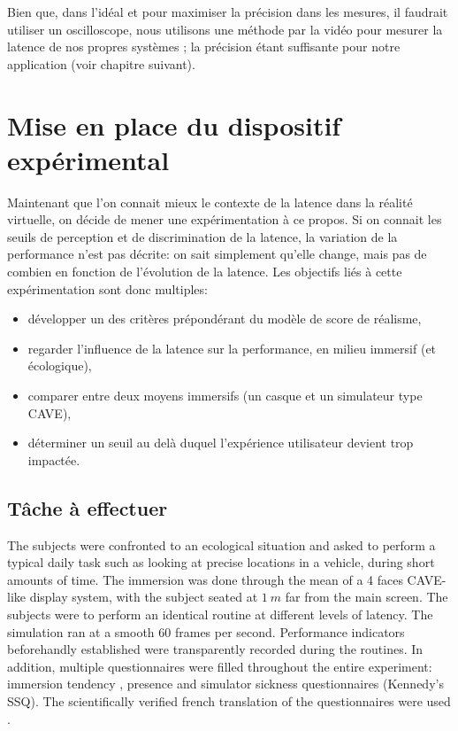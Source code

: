 	\par Bien que, dans l'idéal et pour maximiser la précision dans les mesures, il faudrait utiliser un oscilloscope, nous utilisons une méthode par la vidéo pour mesurer la latence de nos propres systèmes ; la précision étant suffisante pour notre application (voir chapitre suivant).
	
	
\chapter{Mise en place du dispositif expérimental}
	\par Maintenant que l'on connait mieux le contexte de la latence dans la réalité virtuelle, on décide de mener une expérimentation à ce propos. Si on connait les seuils de perception et de discrimination de la latence, la variation de la performance n'est pas décrite: on sait simplement qu'elle change, mais pas de combien en fonction de l'évolution de la latence. Les objectifs liés à cette expérimentation sont donc multiples:
	
	\begin{itemize}
		\item développer un des critères prépondérant du modèle de score de réalisme,
		\item regarder l'influence de la latence sur la performance, en milieu immersif (et écologique),
		\item comparer entre deux moyens immersifs (un casque et un simulateur type CAVE),
		\item déterminer un seuil au delà duquel l'expérience utilisateur devient trop impactée. 
	\end{itemize}	
	
	\section{Tâche à effectuer}
	\par The subjects were confronted to an ecological situation and asked to perform a typical daily task such as looking at precise locations in a vehicle, during short amounts of time. The immersion was done through the mean of a 4 faces CAVE-like display system, with the subject seated at $1~m$ far from the main screen. The subjects were to perform an identical routine at different levels of latency. The simulation ran at a smooth 60 frames per second. Performance indicators beforehandly established were transparently recorded during the routines. In addition, multiple questionnaires were filled throughout the entire experiment: immersion tendency \cite{witmer_measuring_1998}, presence \cite{witmer_measuring_1998} and simulator sickness questionnaires (Kennedy's SSQ). The scientifically verified french translation of the questionnaires were used \cite{bouchard_revising_2007, bouchard_side_2009, bouchard_exploring_2011}.

